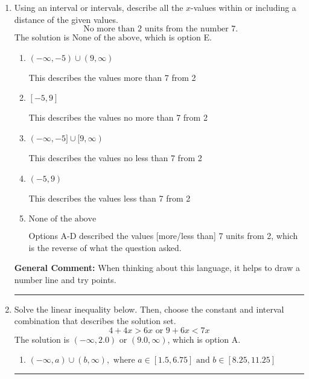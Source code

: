 \documentclass{extbook}[14pt]
\newcommand{\litem}[1]{\item #1

\rule{\textwidth}{0.4pt}}
\begin{document}
\begin{enumerate}
{\begin{enumerate}[label=\Alph*.]
* $(-1.11, 4.00]$, which is the correct option.
\item \( (-\infty, a) \cup [b, \infty), \text{ where } a \in [-9.75, -0.75] \text{ and } b \in [0.75, 5.25] \)

$(-\infty, -1.11) \cup [4.00, \infty)$, which corresponds to displaying the and-inequality as an or-inequality.
\item \( (-\infty, a] \cup (b, \infty), \text{ where } a \in [-1.5, 0.38] \text{ and } b \in [3, 9.75] \)

$(-\infty, -1.11] \cup (4.00, \infty)$, which corresponds to displaying the and-inequality as an or-inequality AND flipping the inequality.
\item \( \text{None of the above.} \)


\end{enumerate}

\textbf{General Comment:} To solve, you will need to break up the compound inequality into two inequalities. Be sure to keep track of the inequality! It may be best to draw a number line and graph your solution.
}
\litem{
Using an interval or intervals, describe all the $x$-values within or including a distance of the given values.
\[ \text{ No more than } 2 \text{ units from the number } 7. \]The solution is \( \text{None of the above} \), which is option E.\begin{enumerate}[label=\Alph*.]
\item \( (-\infty, -5) \cup (9, \infty) \)

This describes the values more than 7 from 2
\item \( [-5, 9] \)

This describes the values no more than 7 from 2
\item \( (-\infty, -5] \cup [9, \infty) \)

This describes the values no less than 7 from 2
\item \( (-5, 9) \)

This describes the values less than 7 from 2
\item \( \text{None of the above} \)

Options A-D described the values [more/less than] 7 units from 2, which is the reverse of what the question asked.
\end{enumerate}

\textbf{General Comment:} When thinking about this language, it helps to draw a number line and try points.
}
\litem{
Solve the linear inequality below. Then, choose the constant and interval combination that describes the solution set.
\[ 4 + 4 x > 6 x \text{ or } 9 + 6 x < 7 x \]The solution is \( (-\infty, 2.0) \text{ or } (9.0, \infty) \), which is option A.\begin{enumerate}[label=\Alph*.]
\item \( (-\infty, a) \cup (b, \infty), \text{ where } a \in [1.5, 6.75] \text{ and } b \in [8.25, 11.25] \)


\end{enumerate}}
\end{enumerate}
\end{document}
